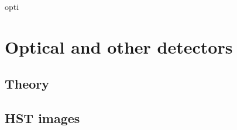 \documentclass{tufte-book}
\begin{document}











opti\chapter{Optical and other detectors}


\section{Theory}

\section{HST images}
\end{document}
